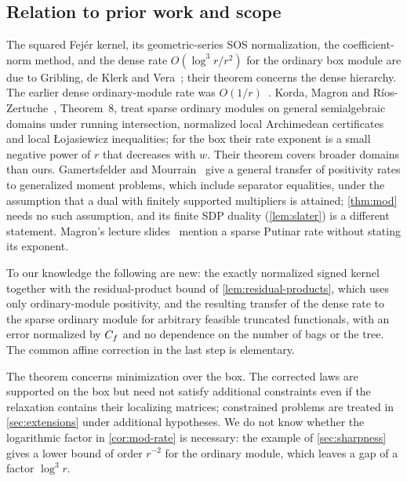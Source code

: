 \subsection{Relation to prior work and scope}\label{sec:mod-prior}

\begin{remark}\label{rem:mod-prior}
The squared Fejér kernel, its geometric-series SOS normalization, the
coefficient-norm method, and the dense rate $O(\log^3r/r^2)$ for the
ordinary box module are due to Gribling, de Klerk and
Vera~\cite{gribling2026-squared-kernels}; their theorem concerns the dense
hierarchy. The earlier dense ordinary-module rate was
$O(1/r)$~\cite{baldi2024-putinar-hypercube}. Korda, Magron and
Ríos-Zertuche~\cite{korda2025-convergence-rates-sparsity}, Theorem~8, treat
sparse ordinary modules on general semialgebraic domains under running
intersection, normalized local Archimedean certificates and local
Łojasiewicz inequalities; for the box their rate exponent is a small
negative power of $r$ that decreases with $w$. Their theorem covers
broader domains than ours. Gamertsfelder and
Mourrain~\cite{gamertsfelder2025-countable-gmp} give a general transfer of
positivity rates to generalized moment problems, which include separator
equalities, under the assumption that a dual with finitely supported
multipliers is attained; \cref{thm:mod} needs no such assumption, and its
finite SDP duality (\cref{lem:slater}) is a different statement. Magron's
lecture slides~\cite{magron2026slides-tenors} mention a sparse Putinar
rate without stating its exponent.

To our knowledge the following are new: the exactly normalized signed
kernel together with the residual-product bound of
\cref{lem:residual-products}, which uses only ordinary-module positivity,
and the resulting transfer of the dense rate to the sparse ordinary module
for arbitrary feasible truncated functionals, with an error normalized by
$C_f$ and no dependence on the number of bags or the tree. The common
affine correction in the last step is elementary.
\end{remark}

The theorem concerns minimization over the box. The corrected laws are
supported on the box but need not satisfy additional constraints even if
the relaxation contains their localizing matrices; constrained problems are
treated in \cref{sec:extensions} under additional hypotheses. We do not
know whether the logarithmic factor in \cref{cor:mod-rate} is necessary:
the example of \cref{sec:sharpness} gives a lower bound of order $r^{-2}$
for the ordinary module, which leaves a gap of a factor $\log^3r$.
